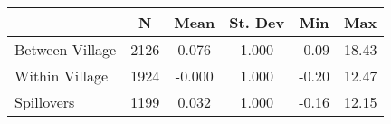 \begin{tabular}{l*{5}{c}}\hline&\multicolumn{1}{c}{N}&\multicolumn{1}{c}{Mean}&\multicolumn{1}{c}{St. Dev}&\multicolumn{1}{c}{Min}&\multicolumn{1}{c}{Max}\\ \hline 
Between Village & 2126 & 0.076 & 1.000 & -0.09 & 18.43 \\
Within Village & 1924 & -0.000 & 1.000 & -0.20 & 12.47 \\
Spillovers & 1199 & 0.032 & 1.000 & -0.16 & 12.15 \\
\hline \end{tabular}
